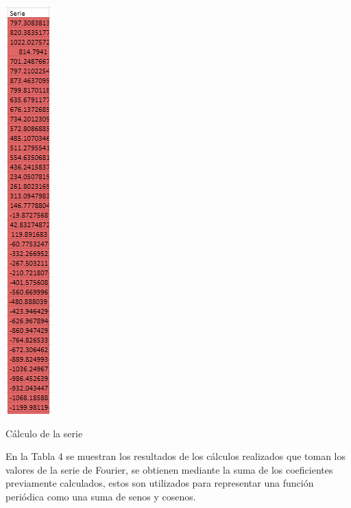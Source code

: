 \begin{table}[H]
    \centering
    \includegraphics[width=0.69792in,height=6.19792in]{media/image28.png}
    \caption{Cálculo de la serie}
\end{table}
En la Tabla 4 se muestran los resultados de los cálculos realizados que toman los valores de la serie de Fourier, se obtienen mediante la suma de los coeficientes previamente calculados, estos son utilizados para representar una función periódica como una suma de senos y cosenos.
